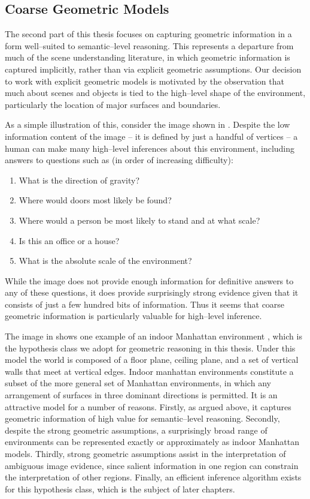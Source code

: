 \subsection{Coarse Geometric Models}

The second part of this thesis focuses on capturing geometric
information in a form well--suited to semantic--level reasoning. This
represents a departure from much of the scene understanding
literature, in which geometric information is captured implicitly,
rather than via explicit geometric assumptions. Our decision to work
with explicit geometric models is motivated by the observation that
much about scenes and objects is tied to the high--level shape of the
environment, particularly the location of major surfaces and
boundaries.

As a simple illustration of this, consider the image shown in
. Despite the low information content of the
image -- it is defined by just a handful of vertices -- a human can
make many high--level inferences about this environment, including
answers to questions such as (in order of increasing difficulty):
\begin{enumerate}
  \item{What is the direction of gravity?}
  \item{Where would doors most likely be found?}
  \item{Where would a person be most likely to stand and at what scale?}
  \item{Is this an office or a house?}
  \item{What is the absolute scale of the environment?}
\end{enumerate}

While the image does not provide enough information for definitive
answers to any of these questions, it does provide surprisingly strong
evidence given that it consists of just a few hundred bits of
information. Thus it seems that coarse geometric information is
particularly valuable for high--level inference.

The image in  shows one example of an indoor
Manhattan environment \cite{Lee09}, which is the hypothesis class we
adopt for geometric reasoning in this thesis. Under this model the
world is composed of a floor plane, ceiling plane, and a set of
vertical walls that meet at vertical edges. Indoor manhattan
environments constitute a subset of the more general set of Manhattan
environments, in which any arrangement of surfaces in three dominant
directions is permitted. It is an attractive model for a number of
reasons. Firstly, as argued above, it captures geometric information
of high value for semantic--level reasoning. Secondly, despite the
strong geometric assumptions, a surprisingly broad range of
environments can be represented exactly or approximately as indoor
Manhattan models. Thirdly, strong geometric assumptions assist in the
interpretation of ambiguous image evidence, since salient information
in one region can constrain the interpretation of other
regions. Finally, an efficient inference algorithm exists for this
hypothesis class, which is the subject of later chapters.

